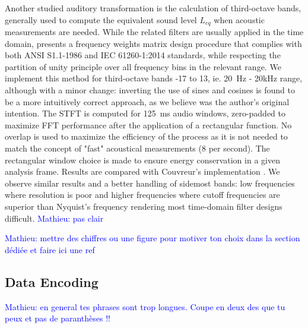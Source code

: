 \documentclass[final,3p,times,twocolumn]{elsarticle}
\newcommand{\ml}[1]{\textcolor{blue}{ Mathieu: #1}}
\begin{document}
Another studied auditory transformation is the calculation of third-octave bands, generally used to compute the equivalent sound level $L_{eq}$ when acoustic measurements are needed. While the related filters are usually applied in the time domain, \cite{antoni2010} presents a frequency weights matrix design procedure that complies with both ANSI S1.1-1986 and IEC 61260-1:2014 standards, while respecting the partition of unity principle over all frequency bins in the relevant range. We implement this method for third-octave bands -17 to 13, ie. 20~Hz - 20kHz range, although with a minor change: inverting the use of sines and cosines is found to be a more intuitively correct approach, as we believe was the author's original intention. The STFT is computed for 125~ms audio windows, zero-padded to maximize FFT performance after the application of a rectangular function. No overlap is used to maximize the efficiency of the process as it is not needed to match the concept of "fast" acoustical measurements (8 per second). The rectangular window choice is made to ensure energy conservation in a given analysis frame. Results are compared with Couvreur's implementation \cite{couvreur}. We observe similar results and a better handling of sidemost bands: low frequencies where resolution is poor and higher frequencies where cutoff frequencies are superior than Nyquist's frequency rendering most time-domain filter designs difficult. \ml{pas clair}

\ml{mettre des chiffres ou une figure pour motiver ton choix dans la section dédiée et faire ici une ref}

\subsection{Data Encoding}

\ml{en general tes phrases sont trop longues. Coupe en deux des que tu peux et pas de paranthèses !!}
\end{document}
